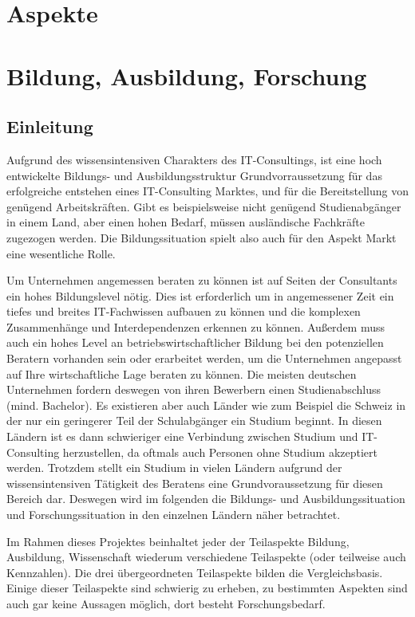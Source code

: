 \chapter{Aspekte}



\chapter{Bildung, Ausbildung, Forschung}

\section{Einleitung}
Aufgrund des wissensintensiven Charakters des IT-Consultings, ist eine hoch entwickelte Bildungs- und Ausbildungsstruktur Grundvorraussetzung für das erfolgreiche entstehen eines IT-Consulting Marktes, und für die Bereitstellung von genügend Arbeitskräften.
Gibt es beispielsweise nicht genügend Studienabgänger in einem Land, aber einen hohen Bedarf, müssen ausländische Fachkräfte zugezogen werden. Die Bildungssituation spielt also auch für den Aspekt Markt eine wesentliche Rolle.

Um Unternehmen angemessen beraten zu können ist auf Seiten der Consultants ein hohes Bildungslevel nötig. Dies ist erforderlich um in angemessener Zeit ein tiefes und breites IT-Fachwissen aufbauen zu können und die komplexen Zusammenhänge und Interdependenzen erkennen zu können. Außerdem muss auch ein hohes Level an betriebswirtschaftlicher Bildung bei den potenziellen Beratern vorhanden sein oder erarbeitet werden, um die Unternehmen angepasst auf Ihre wirtschaftliche Lage beraten zu können.
Die meisten deutschen Unternehmen fordern deswegen von ihren Bewerbern einen Studienabschluss (mind. Bachelor). Es existieren aber auch Länder wie zum Beispiel die Schweiz in der nur ein geringerer Teil der Schulabgänger ein Studium beginnt. In diesen Ländern ist es dann schwieriger eine Verbindung zwischen Studium und IT-Consulting herzustellen, da oftmals auch Personen ohne Studium akzeptiert werden.
Trotzdem stellt ein Studium in vielen Ländern aufgrund der wissensintensiven Tätigkeit des Beratens eine Grundvoraussetzung für diesen Bereich dar.
Deswegen wird im folgenden die Bildungs- und Ausbildungssituation und Forschungssituation in den einzelnen Ländern näher betrachtet.

Im Rahmen dieses Projektes beinhaltet jeder der Teilaspekte Bildung, Ausbildung, Wissenschaft wiederum verschiedene Teilaspekte (oder teilweise auch Kennzahlen). Die drei übergeordneten Teilaspekte bilden die Vergleichsbasis. Einige dieser Teilaspekte sind schwierig zu erheben, zu bestimmten Aspekten sind auch gar keine Aussagen möglich, dort besteht Forschungsbedarf. 

